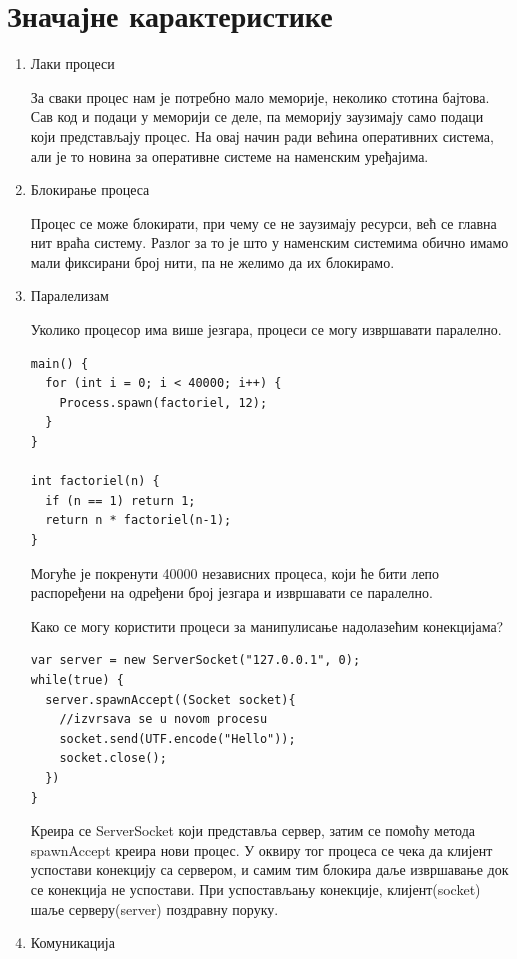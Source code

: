 \documentclass[12pt,oneside]{memoir}
\begin{document}
\section{Значајне карактеристике}
\begin{enumerate} 
\item Лаки процеси

За сваки процес нам је потребно мало меморије, неколико стотина бајтова. Сав код и подаци у меморији се деле, па меморију заузимају само подаци који представљају процес. На овај начин ради већина оперативних система, али је то новина за оперативне системе на наменским уређајима.

\item Блокирање процеса

Процес се може блокирати, при чему се не заузимају ресурси, већ се главна нит враћа систему. Разлог за то је што у наменским системима обично имамо мали фиксирани број нити, па не желимо да их блокирамо. 

\item Паралелизам

Уколико процесор има више језгара, процеси се могу извршавати паралелно.

\begin{verbatim}
main() {
  for (int i = 0; i < 40000; i++) {
    Process.spawn(factoriel, 12);
  }
}

int factoriel(n) {
  if (n == 1) return 1;
  return n * factoriel(n-1);
}
\end{verbatim}
Могуће је покренути 40000 независних процеса, који ће бити лепо распоређени на одређени број језгара и извршавати се паралелно.

Како се могу користити процеси за манипулисање надолазећим конекцијама?

\begin{verbatim}
var server = new ServerSocket("127.0.0.1", 0);
while(true) {
  server.spawnAccept((Socket socket){
	//izvrsava se u novom procesu
	socket.send(UTF.encode("Hello"));
	socket.close();
  })
}
\end{verbatim}

Креира се ServerSocket који представља сервер, затим се помоћу метода spawnAccept креира нови процес. У оквиру тог процеса се чека да клијент успостави конекцију са сервером, и самим тим блокира даље извршавање док се конекција не успостави. При успостављању конекције, клијент(socket) шаље серверу(server) поздравну поруку.


\item Комуникација


\end{enumerate}
\end{document}
